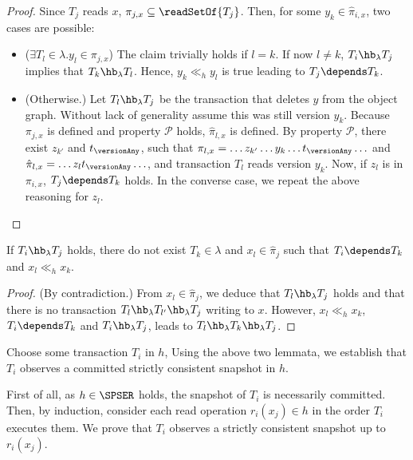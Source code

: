 \begin{proof}

  Since $T_j$ reads $x$, $\pi_{j,x} \subseteq \readSetOf{T_j}$.
  Then, for some $y_k \in \hat{\pi}_{i,x}$, two cases are possible:
  \begin{itemize}
  \item ($\exists T_l \in \lambda. y_l  \in \pi_{j,x}$)
    The claim trivially holds if $l = k$.
    If now $l \neq k$, $T_i \hb_{\lambda} T_j$ implies that $T_k \hb_{\lambda} T_l$.
    Hence, $y_k \ll_{h} y_l$ is true leading to $T_j \depends T_k$.
  \item (Otherwise.)
    Let $T_l \hb_{\lambda} T_j$ be the transaction that deletes $y$ from the object graph.
    Without lack of generality assume this was still version $y_k$.
    Because $\pi_{j,x}$ is defined and property $\mathcal{P}$ holds, $\hat{\pi}_{l,x}$ is defined.
    By property $\mathcal{P}$, there exist $z_{k'}$ and $t_{\versionAny}$, such that
    $\pi_{l,x} = \ldots z_{k'} \ldots y_{k} \ldots t_{\versionAny} \ldots$
    and $\hat{\pi}_{l,x} = \ldots z_{l}t_{\versionAny} \ldots$, and transaction $T_l$ reads version $y_{k}$.
    Now, if $z_l$ is in $\pi_{i,x}$, $T_j \depends T_k$ holds.
    In the converse case, we repeat the above reasoning for $z_l$.
  \end{itemize}     
    
\end{proof}

\begin{lemma}
  If $T_i \hb_{\lambda} T_j$ holds, there do not exist $T_k \in \lambda$ and $x_l \in \hat{\pi}_j$ such that $T_i \depends T_k$ and $x_l \ll_h x_k$.
\end{lemma}

\begin{proof}
  (By contradiction.)
  From $x_l \in \hat{\pi}_j$, we deduce that $T_l \hb_{\lambda} T_j$ holds and that there is no transaction $T_l \hb_{\lambda} T_{l'} \hb_{\lambda} T_j$ writing to $x$.
  However, $x_l \ll_h x_k$, $T_i \depends T_k$ and $T_i \hb_{\lambda} T_j$, leads to $T_l \hb_{\lambda} T_{k} \hb_{\lambda} T_j$.
\end{proof}

Choose some transaction $T_i$ in $h$,
Using the above two lemmata, we establish that $T_i$ observes a committed strictly consistent snapshot in $h$.

First of all, as $h \in \SPSER$ holds, the snapshot of $T_i$ is necessarily committed.
Then, by induction, consider each read operation $r_i(x_j) \in h$ in the order $T_i$ executes them.
We prove that $T_i$ observes a strictly consistent snapshot up to $r_i(x_j)$.

